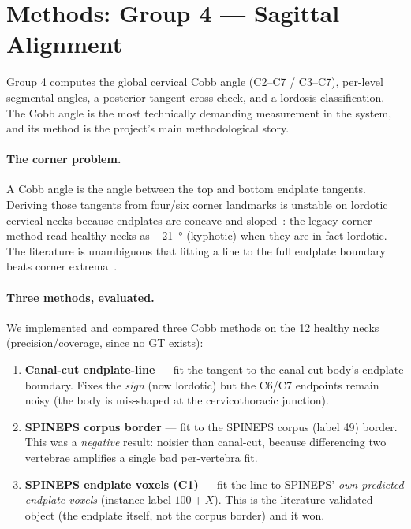 \section{Methods: Group 4 --- Sagittal Alignment}
\label{sec:g4}

Group 4 computes the global cervical Cobb angle (C2--C7 / C3--C7), per-level segmental angles, a
posterior-tangent cross-check, and a lordosis classification. The Cobb angle is the most technically
demanding measurement in the system, and its method is the project's main methodological story.

\paragraph{The corner problem.} A Cobb angle is the angle between the top and bottom endplate tangents.
Deriving those tangents from four/six corner landmarks is unstable on lordotic cervical necks because
endplates are concave and sloped~\cite{chen2013}: the legacy corner method read healthy necks as
\SI{-21}{\degree} (kyphotic) when they are in fact lordotic. The literature is unambiguous that fitting a
line to the full endplate boundary beats corner extrema~\cite{wang2023}.

\paragraph{Three methods, evaluated.} We implemented and compared three Cobb methods on the 12 healthy
necks (precision/coverage, since no GT exists):
\begin{enumerate}[leftmargin=*]
  \item \textbf{Canal-cut endplate-line} --- fit the tangent to the canal-cut body's endplate boundary.
  Fixes the \emph{sign} (now lordotic) but the C6/C7 endpoints remain noisy (the body is mis-shaped at
  the cervicothoracic junction).
  \item \textbf{SPINEPS corpus border} --- fit to the SPINEPS corpus (label 49) border. This was a
  \emph{negative} result: noisier than canal-cut, because differencing two vertebrae amplifies a single
  bad per-vertebra fit.
  \item \textbf{SPINEPS endplate voxels (C1)} --- fit the line to SPINEPS' \emph{own predicted endplate
  voxels} (instance label $100+X$). This is the literature-validated object (the endplate itself, not the
  corpus border) and it won.
\end{enumerate}

